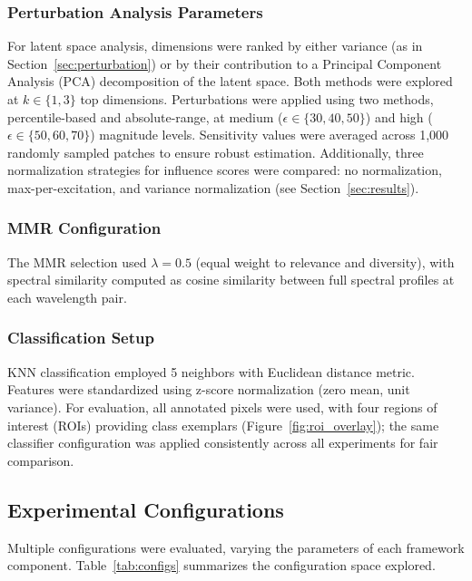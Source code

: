\subsubsection{Perturbation Analysis Parameters}
For latent space analysis, dimensions were ranked by either variance (as in Section~\ref{sec:perturbation}) or by their contribution to a Principal Component Analysis (PCA) decomposition of the latent space.
Both methods were explored at $k \in \{1, 3\}$ top dimensions. Perturbations were applied using two methods, percentile-based and absolute-range, at medium ($\epsilon \in \{30, 40, 50\}$) and high ($\epsilon \in \{50, 60, 70\}$) magnitude levels.
Sensitivity values were averaged across 1,000 randomly sampled patches to ensure robust estimation.
Additionally, three normalization strategies for influence scores were compared: no normalization, max-per-excitation, and variance normalization (see Section~\ref{sec:results}).

\subsubsection{MMR Configuration}
The MMR selection used $\lambda = 0.5$ (equal weight to relevance and diversity), with spectral similarity computed as cosine similarity between full spectral profiles at each wavelength pair.

\subsubsection{Classification Setup}
KNN classification employed 5 neighbors with Euclidean distance metric.
Features were standardized using z-score normalization (zero mean, unit variance).
For evaluation, all annotated pixels were used, with four regions of interest (ROIs) providing class exemplars (Figure~\ref{fig:roi_overlay}); the same classifier configuration was applied consistently across all experiments for fair comparison.

\subsection{Experimental Configurations}
\label{sec:configurations}

Multiple configurations were evaluated, varying the parameters of each framework component.
Table~\ref{tab:configs} summarizes the configuration space explored.

